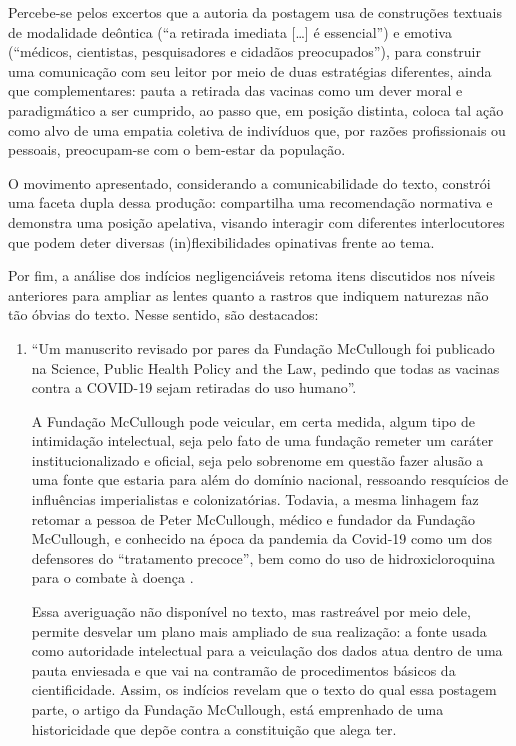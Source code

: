 \documentclass[portuguese]{textolivre}
\begin{document}
\begin{enumerate}
Percebe-se pelos excertos que a autoria da postagem usa de construções textuais de modalidade deôntica (“a retirada imediata […] é essencial”) e emotiva (“médicos, cientistas, pesquisadores e cidadãos preocupados”), para construir uma comunicação com seu leitor por meio de duas estratégias diferentes, ainda que complementares: pauta a retirada das vacinas como um dever moral e paradigmático a ser cumprido, ao passo que, em posição distinta, coloca tal ação como alvo de uma empatia coletiva de indivíduos que, por razões profissionais ou pessoais, preocupam-se com o bem-estar da população.

O movimento apresentado, considerando a comunicabilidade do texto, constrói uma faceta dupla dessa produção: compartilha uma recomendação normativa e demonstra uma posição apelativa, visando interagir com diferentes interlocutores que podem deter diversas (in)flexibilidades opinativas frente ao tema.

Por fim, a análise dos indícios negligenciáveis retoma itens discutidos nos níveis anteriores para ampliar as lentes quanto a rastros que indiquem naturezas não tão óbvias do texto. Nesse sentido, são destacados:

\begin{enumerate}
    \item “Um manuscrito revisado por pares da Fundação McCullough foi publicado na Science, Public Health Policy and the Law, pedindo que todas as vacinas contra a COVID-19 sejam retiradas do uso humano”.

    A Fundação McCullough pode veicular, em certa medida, algum tipo de intimidação intelectual, seja pelo fato de uma fundação remeter um caráter institucionalizado e oficial, seja pelo sobrenome em questão fazer alusão a uma fonte que estaria para além do domínio nacional, ressoando resquícios de influências imperialistas e colonizatórias. Todavia, a mesma linhagem faz retomar a pessoa de Peter McCullough, médico e fundador da Fundação McCullough, e conhecido na época da pandemia da Covid-19 como um dos defensores do “tratamento precoce”, bem como do uso de hidroxicloroquina para o combate à doença \cite{estadao2021cloroquina}.
    
Essa averiguação não disponível no texto, mas rastreável por meio dele, permite desvelar um plano mais ampliado de sua realização: a fonte usada como autoridade intelectual para a veiculação dos dados atua dentro de uma pauta enviesada e que vai na contramão de procedimentos básicos da cientificidade. Assim, os indícios revelam que o texto do qual essa postagem parte, o artigo da Fundação McCullough, está emprenhado de uma historicidade que depõe contra a constituição que alega ter.


\end{enumerate}
\end{enumerate}
\end{document}
